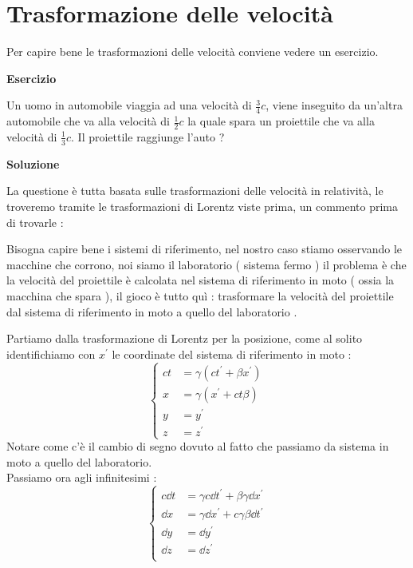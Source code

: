 \documentclass[a4paper, 12pt, twoside]{report}
\begin{document}
\section{Trasformazione delle velocità}
Per capire bene le trasformazioni delle velocità conviene vedere un esercizio.\\
\begin{center}\textbf{Esercizio  }\end{center} 
Un uomo in automobile viaggia ad una velocità di $\frac{3}{4}c$, viene inseguito da un'altra automobile che va alla velocità di $\frac{1}{2}c$ 
la quale spara un proiettile che va alla velocità di $\frac{1}{3}c$.
Il proiettile raggiunge l'auto ? \\
\begin{center}\textbf{Soluzione}\end{center}
La questione è tutta basata sulle trasformazioni delle velocità in relatività, le troveremo tramite le trasformazioni di Lorentz viste prima, 
un commento prima di trovarle : 
\\
\begin{tcolorbox}[colback=red!5!white,colframe=red!50!black,title=ATTENZIONE !]
Bisogna capire bene i sistemi di riferimento, nel nostro caso stiamo osservando le macchine che corrono, noi siamo il laboratorio ( sistema fermo )
il problema è che la velocità del proiettile è calcolata nel sistema di riferimento in moto ( ossia la macchina che spara ), il gioco è tutto quì : 
trasformare la velocità del proiettile dal sistema di riferimento in moto a quello del laboratorio . 
\end{tcolorbox}
Partiamo dalla trasformazione di Lorentz per la posizione, come al solito identifichiamo con $x^{\prime}$ le coordinate del sistema di riferimento in moto : 
\begin{equation*}
\left\{ \begin{aligned}
                ct&=\gamma(ct^{\prime} + \beta x^{\prime}) \\
        x&= \gamma( x^{\prime} + ct\beta ) \\
        y&= y^{\prime} \\
        z&= z^{\prime}
  \end{aligned}
  \right.
\end{equation*}
Notare come c'è il cambio di segno dovuto al fatto che passiamo da sistema in moto a quello del laboratorio. \\
Passiamo ora agli infinitesimi : 
\begin{equation*}
        \left\{ \begin{aligned}
                        c\dd{t} &= \gamma c\dd{t^{\prime}} + \beta\gamma\dd{x^{\prime}} \\
                        \dd{x} &= \gamma\dd{x^{\prime}} + c\gamma\beta\dd{t^{\prime}} \\
                        \dd{y} &= \dd{y^{\prime}} \\
                        \dd{z} &= \dd{z^{\prime}} \\
                \end{aligned}
                \right.
\end{equation*}
\end{document}
